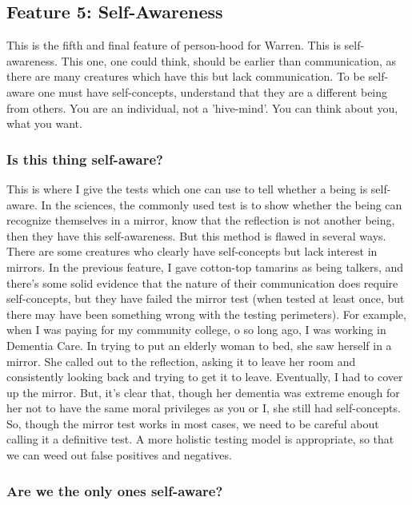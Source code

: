 \subsection{Feature 5: Self-Awareness}

This is the fifth and final feature of person-hood for Warren. This is self-awareness. This one, one could think, should be earlier than communication, as there are many creatures which have this but lack communication. To be self-aware one must have self-concepts, understand that they are a different being from others. You are an individual, not a 'hive-mind'. You can think about you, what you want.
\subsubsection{Is this thing self-aware?}

This is where I give the tests which one can use to tell whether a being is self-aware. In the sciences, the commonly used test is to show whether the being can recognize themselves in a mirror, know that the reflection is not another being, then they have this self-awareness.  But this method is flawed in several ways. There are some creatures who clearly have self-concepts but lack interest in mirrors. In the previous feature, I gave cotton-top tamarins as being talkers, and there's some solid evidence that the nature of their communication does require self-concepts, but they have failed the mirror test (when tested at least once, but there may have been something wrong with the testing perimeters). For example, when I was paying for my community college, o so long ago, I was working in Dementia Care. In trying to put an elderly woman to bed, she saw herself in a mirror. She called out to the reflection, asking  it to leave her room and consistently looking back and trying to get it to leave. Eventually, I had to cover up the mirror. But, it's clear that, though her dementia was extreme enough for her not to have the same moral privileges as you or I, she still had self-concepts.  So, though the mirror test works in most cases, we need to be careful about calling it a definitive test. A more holistic testing model is appropriate, so that we can weed out false positives and negatives.  
\subsubsection{Are we the only ones self-aware?}

